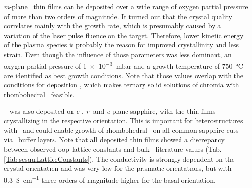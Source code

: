 \textit{m}-plane \cro\ thin films can be deposited over a wide range of oxygen partial pressure of more than two orders of magnitude.
It turned out that the crystal quality correlates mainly with the growth rate, which is presumably caused by a variation of the laser pulse fluence on the target.
Therefore, lower kinetic energy of the plasma species is probably the reason for improved crystallinity and less strain.
Even though the influence of those parameters was less dominant, an oxygen partial pressure of \qty{1e-3}{\milli\bar} and a growth temperature of \qty{750}{\degreeCelsius} are identified as best growth conditions.
Note that those values overlap with the conditions for deposition \agao, which makes ternary solid solutions of chromia with rhombohedral \gao\ feasible.

\textalpha-\cro\ was also deposited on \textit{c}-, \textit{r}- and \textit{a}-plane sapphire, with the thin films crystallizing in the respective orientation.
This is important for heterostructures with \agao\ and could enable growth of rhombohedral \gao\ on all common sapphire cuts via \cro\ buffer layers.
Note that all deposited thin films showed a discrepancy between observed \gls{oop}\ lattice constants and bulk \cro\ literature values (Tab.\,\ref{Tab:sesquiLatticeConstants}).
The conductivity is strongly dependent on the crystal orientation and was very low for the prismatic orientations, but with \qty{0.3}{\siemens\per\cm} three orders of magnitude higher for the basal orientation.